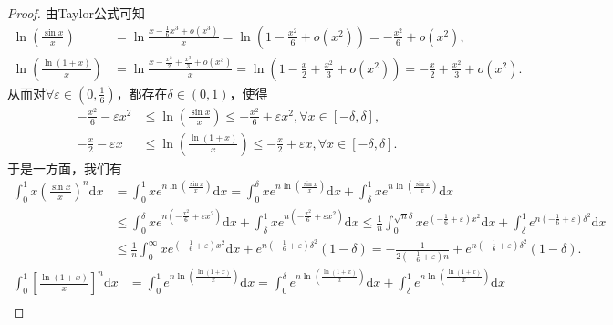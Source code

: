 \documentclass[../../main.tex]{subfiles}
\begin{document}
\begin{proof}
由Taylor公式可知
\begin{align*}
\ln \left( \frac{\sin x}{x} \right) &=\ln \frac{x-\frac{1}{6}x^3+o\left( x^3 \right)}{x}=\ln \left( 1-\frac{x^2}{6}+o\left( x^2 \right) \right) =-\frac{x^2}{6}+o\left( x^2 \right) ,\\
\ln \left( \frac{\ln \left( 1+x \right)}{x} \right) &=\ln \frac{x-\frac{x^2}{2}+\frac{x^3}{3}+o\left( x^3 \right)}{x}=\ln \left( 1-\frac{x}{2}+\frac{x^2}{3}+o\left( x^2 \right) \right) =-\frac{x}{2}+\frac{x^2}{3}+o\left( x^2 \right) .
\end{align*}
从而对$\forall \varepsilon \in \left( 0,\frac{1}{6} \right)$，都存在$\delta \in (0,1)$，使得
\begin{align*}
-\frac{x^2}{6}-\varepsilon x^2&\leqslant \ln \left( \frac{\sin x}{x} \right) \leqslant -\frac{x^2}{6}+\varepsilon x^2,\forall x\in [-\delta ,\delta ] ,\\
-\frac{x}{2}-\varepsilon x&\leqslant \ln \left( \frac{\ln \left( 1+x \right)}{x} \right) \leqslant -\frac{x}{2}+\varepsilon x,\forall x\in [-\delta ,\delta ] .
\end{align*}
于是一方面，我们有
\begin{align*}
\int_0^1{x\left( \frac{\sin x}{x} \right) ^n\mathrm{d}x}&=\int_0^1{xe^{n\ln \left( \frac{\sin x}{x} \right)}\mathrm{d}x}=\int_0^{\delta}{xe^{n\ln \left( \frac{\sin x}{x} \right)}\mathrm{d}x}+\int_{\delta}^1{xe^{n\ln \left( \frac{\sin x}{x} \right)}\mathrm{d}x}\\
&\leqslant \int_0^{\delta}{xe^{n\left( -\frac{x^2}{6}+\varepsilon x^2 \right)}\mathrm{d}x}+\int_{\delta}^1{xe^{n\left( -\frac{x^2}{6}+\varepsilon x^2 \right)}\mathrm{d}x}\leqslant \frac{1}{n}\int_0^{\sqrt{n}\delta}{xe^{\left( -\frac{1}{6}+\varepsilon \right) x^2}\mathrm{d}x}+\int_{\delta}^1{e^{n\left( -\frac{1}{6}+\varepsilon \right) \delta ^2}\mathrm{d}x}\\
&\leqslant \frac{1}{n}\int_0^{\infty}{xe^{\left( -\frac{1}{6}+\varepsilon \right) x^2}\mathrm{d}x}+e^{n\left( -\frac{1}{6}+\varepsilon \right) \delta ^2}\left( 1-\delta \right) =-\frac{1}{2\left( -\frac{1}{6}+\varepsilon \right) n}+e^{n\left( -\frac{1}{6}+\varepsilon \right) \delta ^2}\left( 1-\delta \right) .
\end{align*}
\begin{align*}
\int_0^1{\left[ \frac{\ln \left( 1+x \right)}{x} \right] ^n\mathrm{d}x}&=\int_0^1{e^{n\ln \left( \frac{\ln \left( 1+x \right)}{x} \right)}\mathrm{d}x}=\int_0^{\delta}{e^{n\ln \left( \frac{\ln \left( 1+x \right)}{x} \right)}\mathrm{d}x}+\int_{\delta}^1{e^{n\ln \left( \frac{\ln \left( 1+x \right)}{x} \right)}\mathrm{d}x}\\

\end{align*}
\end{proof}
\end{document}
